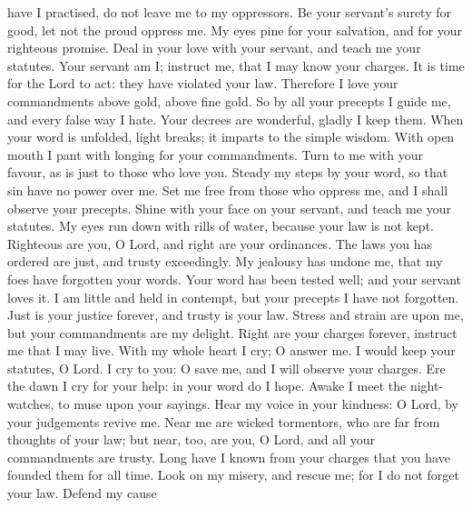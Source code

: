 have I practised, do not leave me to my oppressors.  Be
your servant's surety for good, let not the proud oppress me.
 My eyes pine for your salvation, and for your righteous
promise.  Deal in your love with your servant, and teach
me your statutes.  Your servant am I; instruct me, that I
may know your charges.  It is time for the Lord to act:
they have violated your law.  Therefore I love your
commandments above gold, above fine gold.  So by all your
precepts I guide me, and every false way I hate.  Your
decrees are wonderful, gladly I keep them.  When your word
is unfolded, light breaks; it imparts to the simple wisdom.
 With open mouth I pant with longing for your
commandments.  Turn to me with your favour, as is just to
those who love you.  Steady my steps by your word, so that
sin have no power over me.  Set me free from those who
oppress me, and I shall observe your precepts.  Shine with
your face on your servant, and teach me your statutes.  My
eyes run down with rills of water, because your law is not kept.
 Righteous are you, O Lord, and right are your ordinances.
 The laws you has ordered are just, and trusty
exceedingly.  My jealousy has undone me, that my foes have
forgotten your words.  Your word has been tested well; and
your servant loves it.  I am little and held in contempt,
but your precepts I have not forgotten.  Just is your
justice forever, and trusty is your law.  Stress and
strain are upon me, but your commandments are my delight. 
Right are your charges forever, instruct me that I may live.
 With my whole heart I cry; O answer me. I would keep your
statutes, O Lord.  I cry to you: O save me, and I will
observe your charges.  Ere the dawn I cry for your help:
in your word do I hope.  Awake I meet the night-watches,
to muse upon your sayings.  Hear my voice in your
kindness: O Lord, by your judgements revive me.  Near me
are wicked tormentors, who are far from thoughts of your law;
 but near, too, are you, O Lord, and all your commandments
are trusty.  Long have I known from your charges that you
have founded them for all time.  Look on my misery, and
rescue me; for I do not forget your law.  Defend my cause
